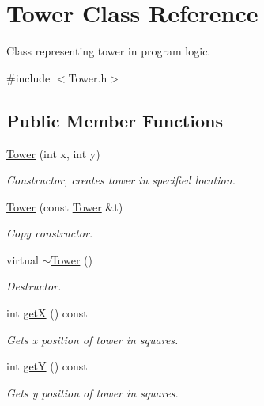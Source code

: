 \hypertarget{class_tower}{}\section{Tower Class Reference}
\label{class_tower}


Class representing tower in program logic.  




{\ttfamily \#include $<$Tower.\+h$>$}

\subsection*{Public Member Functions}
\begin{DoxyCompactItemize}
\item 
\mbox{\hyperlink{class_tower_a330b70ccd30f0964eab8c905fe25fdcf}{Tower}} (int x, int y)
\begin{DoxyCompactList}\small\item\em Constructor, creates tower in specified location. \end{DoxyCompactList}\item 
\mbox{\hyperlink{class_tower_a36ad07a9298039e649fcc4eb01dce120}{Tower}} (const \mbox{\hyperlink{class_tower}{Tower}} \&t)
\begin{DoxyCompactList}\small\item\em Copy constructor. \end{DoxyCompactList}\item 
\mbox{\label{class_tower_a96972da33c287758c036c944eccdc5fe}} 
virtual \mbox{\hyperlink{class_tower_a96972da33c287758c036c944eccdc5fe}{$\sim$\+Tower}} ()
\begin{DoxyCompactList}\small\item\em Destructor. \end{DoxyCompactList}\item 
int \mbox{\hyperlink{class_tower_ac5c9e76603f3ae1290b86796578ed69f}{getX}} () const
\begin{DoxyCompactList}\small\item\em Gets x position of tower in squares. \end{DoxyCompactList}\item 
int \mbox{\hyperlink{class_tower_a8efdcbaa1b0dc9866eb753ba3871c533}{getY}} () const
\begin{DoxyCompactList}\small\item\em Gets y position of tower in squares. \end{DoxyCompactList}\item 

\end{DoxyCompactItemize}

